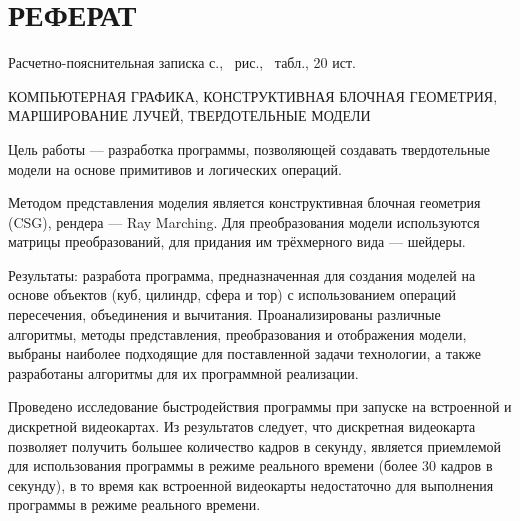 \section*{РЕФЕРАТ}

Расчетно-пояснительная записка \pageref{LastPage} с., \totalfigures\ рис., \totaltables\ табл., 20 ист.

КОМПЬЮТЕРНАЯ ГРАФИКА, КОНСТРУКТИВНАЯ БЛОЧНАЯ ГЕОМЕТРИЯ, МАРШИРОВАНИЕ ЛУЧЕЙ, ТВЕРДОТЕЛЬНЫЕ МОДЕЛИ

Цель работы --- разработка программы, позволяющей создавать твердотельные модели на основе примитивов и логических операций.

Методом представления моделия является  конструктивная  блочная геометрия  (CSG),
рендера  ---  Ray Marching.
Для  преобразования  модели  используются
матрицы преобразований, для придания им трёхмерного вида --- шейдеры.

Результаты: разработа программа, предназначенная для создания моделей на основе объектов (куб, цилиндр, сфера и тор) с использованием операций пересечения, объединения и
вычитания.
Проанализированы  различные  алгоритмы,  методы  представления,
преобразования  и  отображения  модели,  выбраны  наиболее  подходящие  для поставленной  задачи  технологии,  а  также  разработаны  алгоритмы  для  их
программной реализации.

Проведено исследование быстродействия программы при запуске на встроенной и дискретной видеокартах.
Из результатов следует, что дискретная видеокарта позволяет получить большее количество кадров в секунду, является приемлемой для использования программы в режиме реального времени (более 30 кадров в секунду), в то время как встроенной видеокарты недостаточно для выполнения программы в режиме реального времени.

\pagebreak